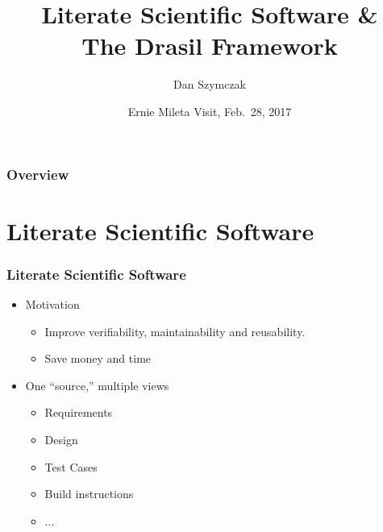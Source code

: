 \documentclass{beamer}
\title[\pgfuseimage{logo}]  %
{Literate Scientific Software \&\\ The Drasil Framework}
\author[Slide \thepage~of \pageref{TotPages}] %
{Dan Szymczak}
\institute[McMaster University] %
{
  Computing and Software Department\\
  Faculty of Engineering\\
  McMaster University
}
\date[Jan 12, 2016] %
{Ernie Mileta Visit, Feb.\ 28, 2017}
\begin{document}
\begin{frame}

\titlepage

\end{frame}


\begin{frame}

\frametitle{Overview}
\tableofcontents


\end{frame}


\section[LSS]{Literate Scientific Software}



\begin{frame}

\frametitle{Literate Scientific Software}

\begin{itemize}
\item Motivation
\begin{itemize}
\item Improve verifiability, maintainability and reusability.
\item Save money and time%
\end{itemize}
\item One ``source,'' multiple views
\begin{itemize}
\item Requirements%
\item Design
\item Test Cases
\item Build instructions
\item ...
\end{itemize}
\end{itemize}
\end{frame}
\end{document}
